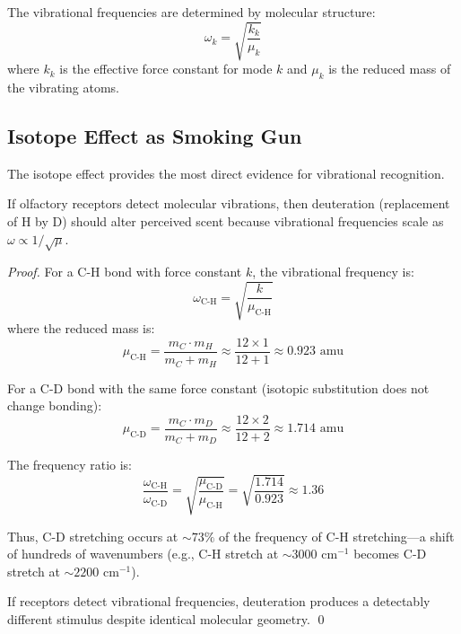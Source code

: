The vibrational frequencies are determined by molecular structure:
\begin{equation}
\omega_k = \sqrt{\frac{k_k}{\mu_k}}
\end{equation}
where $k_k$ is the effective force constant for mode $k$ and $\mu_k$ is the reduced mass of the vibrating atoms.

\subsection{Isotope Effect as Smoking Gun}

The isotope effect provides the most direct evidence for vibrational recognition.

\begin{theorem}
\label{thm:isotope_effect}
If olfactory receptors detect molecular vibrations, then deuteration (replacement of H by D) should alter perceived scent because vibrational frequencies scale as $\omega \propto 1/\sqrt{\mu}$.
\end{theorem}

\begin{proof}
For a C-H bond with force constant $k$, the vibrational frequency is:
\begin{equation}
\omega_{\text{C-H}} = \sqrt{\frac{k}{\mu_{\text{C-H}}}}
\end{equation}
where the reduced mass is:
\begin{equation}
\mu_{\text{C-H}} = \frac{m_C \cdot m_H}{m_C + m_H} \approx \frac{12 \times 1}{12 + 1} \approx 0.923 \text{ amu}
\end{equation}

For a C-D bond with the same force constant (isotopic substitution does not change bonding):
\begin{equation}
\mu_{\text{C-D}} = \frac{m_C \cdot m_D}{m_C + m_D} \approx \frac{12 \times 2}{12 + 2} \approx 1.714 \text{ amu}
\end{equation}

The frequency ratio is:
\begin{equation}
\frac{\omega_{\text{C-H}}}{\omega_{\text{C-D}}} = \sqrt{\frac{\mu_{\text{C-D}}}{\mu_{\text{C-H}}}} = \sqrt{\frac{1.714}{0.923}} \approx 1.36
\end{equation}

Thus, C-D stretching occurs at $\sim 73\%$ of the frequency of C-H stretching—a shift of hundreds of wavenumbers (e.g., C-H stretch at $\sim 3000$ cm$^{-1}$ becomes C-D stretch at $\sim 2200$ cm$^{-1}$).

If receptors detect vibrational frequencies, deuteration produces a detectably different stimulus despite identical molecular geometry. \qed
\end{proof}

